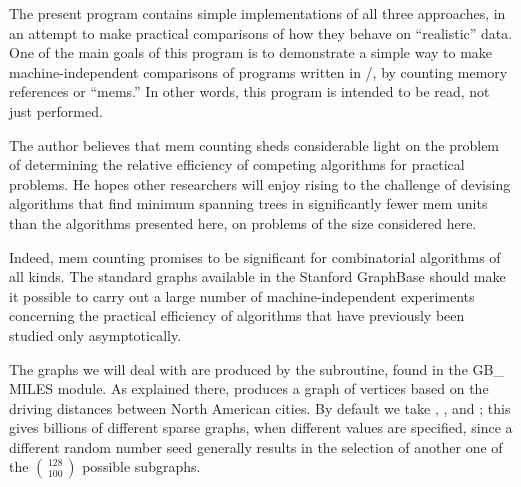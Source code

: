 The present program contains simple implementations of all three
approaches, in an attempt to make practical comparisons of how
they behave on ``realistic'' data. One of the main goals of this
program is to demonstrate a simple way to make machine-independent
comparisons of programs written in \CEE/, by counting memory
references or ``mems.'' In other words, this program is intended
to be read, not just performed.

The author believes that mem counting sheds considerable light on
the problem of determining the relative efficiency of competing
algorithms for practical problems. He hopes other researchers will
enjoy rising to the challenge of devising algorithms that find minimum
spanning trees in significantly fewer mem units than the algorithms
presented here, on problems of the size considered here.

Indeed, mem counting promises to be significant for combinatorial
algorithms of all kinds. The standard graphs available in the
Stanford GraphBase should make it possible to carry out a large
number of machine-independent experiments concerning the practical
efficiency of algorithms that have previously been studied
only asymptotically.

\fi

The graphs we will deal with are produced by the 
subroutine,
found in the {\sc GB\_\,MILES} module. As explained there,
 produces a
graph of  vertices based on the driving distances between
North American cities. By default we take , , and ; this gives billions of different sparse
graphs, when different  values are specified, since a different
random number seed generally results in the selection of another
one of the $\,128\,\choose100$ possible subgraphs.

